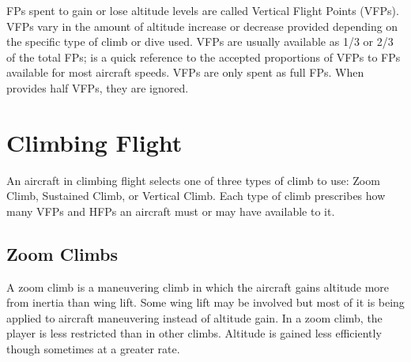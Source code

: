 FPs spent to gain or lose altitude levels are called Vertical Flight Points (VFPs). VFPs vary in the amount of altitude increase or decrease provided depending on the specific type of climb or dive used. VFPs are usually available as 1/3 or 2/3 of the total FPs;  is a quick reference to the accepted proportions of VFPs to FPs available for most aircraft speeds. VFPs are only spent as full FPs. When  provides half VFPs, they are ignored. 

\section{Climbing Flight}
\label{rule:climbing-flight}

An aircraft in climbing flight selects one of three types of climb to use: Zoom Climb, Sustained Climb, or Vertical Climb. Each type of climb prescribes how many VFPs and HFPs an aircraft must or may have available to it.

\subsection{Zoom Climbs}
\label{rule:zoom-climbs}

A zoom climb is a maneuvering climb in which the aircraft gains altitude more from inertia than wing lift. Some wing lift may be involved but most of it is being applied to aircraft maneuvering instead of altitude gain. In a zoom climb, the player is less restricted than in other climbs. Altitude is gained less efficiently though sometimes at a greater rate.


